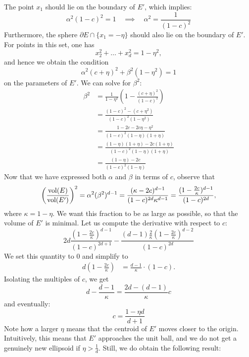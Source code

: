 The point $x_1$ should lie on the boundary of $E'$, which implies:
\[
  \alpha^2 (1-c)^2 = 1 \quad\implies\quad \alpha^2 = \frac{1}{(1-c)^2}
\]
Furthermore, the sphere $\partial E \cap \{ x_1 = -\eta \}$ should also lie on the boundary of $E'$.
For points in this set, one has
\[
  x_2^2 + \dots + x_d^2 = 1 - \eta^2,
\]
and hence we obtain the condition
\[
  \alpha^2 (c + \eta)^2 + \beta^2 (1 -\eta^2) = 1
\]
on the parameters of $E'$.
We can solve for $\beta^2$:
\begin{align*}
  \beta^2
    &= \frac{1}{1 - \eta^2} \left( 1 - \frac{(c+\eta)^2}{(1-c)^2} \right) \\
    &= \frac{(1-c)^2 - (c+\eta^2)}{(1-c)^2 (1-\eta^2)} \\
    &= \frac{1-2c - 2c\eta - \eta^2}{(1-c)^2 (1-\eta)(1+\eta)} \\
    &= \frac{(1-\eta)(1+\eta) - 2c(1 + \eta)}{(1-c)^2 (1-\eta)(1+\eta)} \\
    &= \frac{(1-\eta) - 2c}{(1-c)^2 (1-\eta)}
\end{align*}
Now that we have expressed both $\alpha$ and $\beta$ in terms of $c$,
observe that
\[
  \left(\frac{\operatorname{vol}(E)}{\operatorname{vol}(E')}\right)^2 = \alpha^2 (\beta^2)^{d-1} = \frac{(\kappa - 2c)^{d-1}}{(1-c)^{2d} \kappa^{d-1}} = \frac{(1 - \frac{2c}{\kappa})^{d-1}}{(1-c)^{2d}},
\]
where $\kappa = 1 - \eta$.
We want this fraction to be as large as possible,
so that the volume of $E'$ is minimal.
Let us compute the derivative with respect to $c$:
\[
  2d \frac{(1 - \frac{2c}{\kappa})^{d-1}}{(1-c)^{2d+1}} - \frac{(d-1) \frac{2}{\kappa} (1-\frac{2c}{\kappa})^{d-2}}{(1-c)^{2d}}
\]
We set this quantity to $0$ and simplify to
\begin{align*}
  d(1-\frac{2c}{\kappa}) &= \frac{d-1}{\kappa} \cdot (1-c).
\end{align*}
Isolating the multiples of $c$, we get
\[
  d - \frac{d-1}{\kappa} = \frac{2d - (d-1)}{\kappa} c
\]
and eventually:
\[
  c = \frac{1 - \eta d}{d + 1}
\]
Note how a larger $\eta$ means that the centroid of $E'$ moves closer to the origin.
Intuitively, this means that $E'$ approaches the unit ball,
and we do not get a genuinely new ellipsoid if $\eta > \frac{1}{d}$.
Still, we do obtain the following result:


